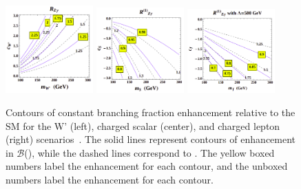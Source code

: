 \begin{figure}[tb]
	\begin{center}
		\includegraphics[width=0.30\textwidth, height=.30\textwidth]{fig/theory/rzgamma_wprime.png}
		\includegraphics[width=0.30\textwidth, height=.30\textwidth]{fig/theory/rzgamma_scalar.png}
		\includegraphics[width=0.30\textwidth, height=.30\textwidth]{fig/theory/rzgamma_fermion.png}
		\caption[Contours of constant branching fraction enhancement relative to the SM for the W' (left), charged scalar (center), 
		and charged lepton (right) scenarios. 
		The solid lines represent contours of enhancement in $\mathcal{B}$(\hzg), while the dashed lines correspond to \hgg{}. The yellow boxed numbers label the enhancement for each 
		\hzg{} contour, and the unboxed numbers label the enhancement for each \hgg{} contour.]
		{Contours of constant branching fraction enhancement relative to the SM for the W' (left), charged scalar (center), 
		and charged lepton (right) scenarios~\cite{Zg_theory_decaywidth}. 
		The solid lines represent contours of enhancement in $\mathcal{B}$(\hzg), while the dashed lines correspond to \hgg{}. The yellow boxed numbers label the enhancement for each 
		\hzg{} contour, and the unboxed numbers label the enhancement for each \hgg{} contour.}
		\label{fig:rzg_bsm}
	\end{center}
\end{figure}

